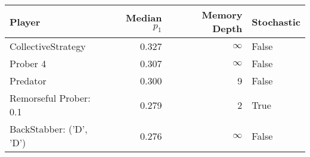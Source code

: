 \begin{tabular}{lrrl}
\toprule
                  Player &  Median $p_1$ &  Memory Depth & Stochastic \\
\midrule
      CollectiveStrategy &         0.327 &            \(\infty\) &      False \\
                Prober 4 &         0.307 &            \(\infty\) &      False \\
                Predator &         0.300 &             9 &      False \\
  Remorseful Prober: 0.1 &         0.279 &             2 &       True \\
 BackStabber: ('D', 'D') &         0.276 &            \(\infty\) &      False \\
\bottomrule
\end{tabular}
